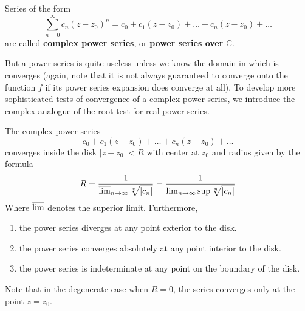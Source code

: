   \begin{definition}
    \label{def:complex-power-series}
    Series of the form 
    \begin{equation}
      \sum_{n=0}^\infty c_n (z - z_0)^n = c_0 + c_1 (z - z_0) + \ldots + c_n (z - z_0) + \ldots
    \end{equation}
    are called \textbf{complex power series}, or \textbf{power series over $\mathbb{C}$}. 
  \end{definition}

  But a power series is quite useless unless we know the domain in which is converges (again, note that it is not always guaranteed to converge onto the function $f$ if its power series expansion does converge at all). To develop more sophisticated tests of convergence of a \hyperref[def:complex-power-series]{complex power series}, we introduce the complex analogue of the \hyperref[real-thm:root-test]{root test} for real power series. 

  \begin{theorem}
    \label{thm:cauchy-hadamard-theorem}
  The \hyperref[def:complex-power-series]{complex power series} 
  \begin{equation}
    c_0 + c_1 (z - z_0) + \ldots + c_n (z - z_0) + \ldots
  \end{equation}
  converges inside the disk $|z - z_0| < R$ with center at $z_0$ and radius given by the formula
  \begin{equation}
    R = \frac{1}{\varlimsup_{n \rightarrow \infty} \sqrt[n]{|c_n|}} = \frac{1}{\lim_{n \rightarrow \infty} \sup{\sqrt[n]{|c_n|}}}
  \end{equation}
  Where $\varlimsup$ denotes the superior limit. Furthermore, 
  \begin{enumerate}
    \item the power series diverges at any point exterior to the disk. 
    \item the power series converges absolutely at any point interior to the disk. 
    \item the power series is indeterminate at any point on the boundary of the disk. 
  \end{enumerate}
  Note that in the degenerate case when $R = 0$, the series converges only at the point $z = z_0$. 
  \end{theorem}

